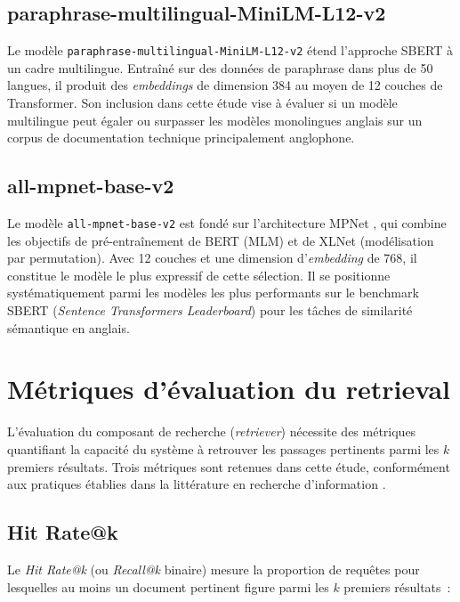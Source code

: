 \documentclass[12pt,a4paper,oneside]{report}
\begin{document}
\subsection{paraphrase-multilingual-MiniLM-L12-v2}

Le modèle \texttt{paraphrase-multilingual-MiniLM-L12-v2} \citep{reimers2020} étend l'approche SBERT à un cadre multilingue. Entraîné sur des données de paraphrase dans plus de 50 langues, il produit des \textit{embeddings} de dimension 384 au moyen de 12 couches de Transformer. Son inclusion dans cette étude vise à évaluer si un modèle multilingue peut égaler ou surpasser les modèles monolingues anglais sur un corpus de documentation technique principalement anglophone.

\subsection{all-mpnet-base-v2}

Le modèle \texttt{all-mpnet-base-v2} \citep{reimers2019} est fondé sur l'architecture MPNet \citep{song2020mpnet}, qui combine les objectifs de pré-entraînement de BERT (MLM) et de XLNet (modélisation par permutation). Avec 12 couches et une dimension d'\textit{embedding} de 768, il constitue le modèle le plus expressif de cette sélection. Il se positionne systématiquement parmi les modèles les plus performants sur le benchmark SBERT (\textit{Sentence Transformers Leaderboard}) pour les tâches de similarité sémantique en anglais.

\section{Métriques d'évaluation du retrieval}
\label{sec:metriques_retrieval}

L'évaluation du composant de recherche (\textit{retriever}) nécessite des métriques quantifiant la capacité du système à retrouver les passages pertinents parmi les $k$ premiers résultats. Trois métriques sont retenues dans cette étude, conformément aux pratiques établies dans la littérature en recherche d'information \citep{manning2008}.

\subsection{Hit Rate@k}

Le \textit{Hit Rate@k} (ou \textit{Recall@k} binaire) mesure la proportion de requêtes pour lesquelles au moins un document pertinent figure parmi les $k$ premiers résultats~:
\end{document}
